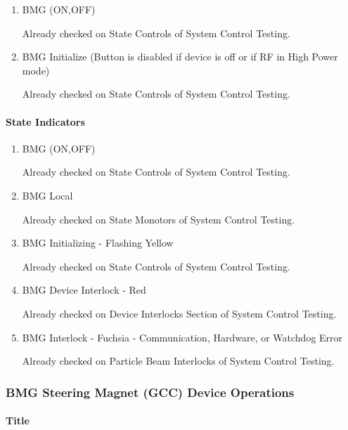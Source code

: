 \documentclass[11pt]{book}		%
\begin{document}
\begin{enumerate}
 \item BMG (ON,OFF)

\color{red}
Already checked on State Controls of System Control Testing.
\color{black}

 \item BMG Initialize (Button is disabled if device is off or if RF in High Power mode)

\color{red}
Already checked on State Controls of System Control Testing.
\color{black}

\end{enumerate}

\paragraph{State Indicators}

\begin{enumerate}
 \item BMG (ON,OFF)

\color{red}
Already checked on State Controls of System Control Testing.
\color{black}

 \item BMG Local

\color{red}
Already checked on State Monotors of System Control Testing.
\color{black}

 \item BMG Initializing - Flashing Yellow

\color{red}
Already checked on State Controls of System Control Testing.
\color{black}

 \item BMG Device Interlock - Red

\color{red}
Already checked on Device Interlocks Section of System Control Testing.
\color{black}

 \item BMG Interlock - Fuchsia - Communication, Hardware, or Watchdog Error

\color{red}
Already checked on Particle Beam Interlocks of System Control Testing.
\color{black}

\end{enumerate}

\subsubsection{BMG Steering Magnet (GCC) Device Operations}

\paragraph{Title} \label{sect:cyc-op-interface-ops-terminal-device-ops-gcc-title}
\end{document}
